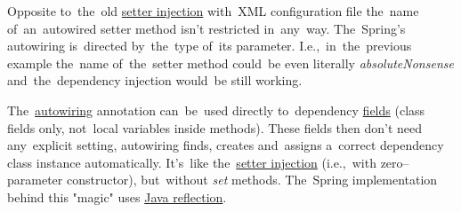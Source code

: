 \note Opposite to~the~old \hyperref[setterinjection]{setter injection} with~XML configuration file the~name of~an~autowired setter method isn't restricted in~any~way. The~Spring's autowiring is~directed by~the~type of~its parameter. I.e.,~in~the~previous example the~name of~the~setter method could~be even literally \textit{absoluteNonsense} and~the~dependency injection would~be still working.
\newpage

\label{fieldinjection}
The~\hyperref[autowiring]{autowiring} annotation can~be~used directly to~dependency \hyperref[variablefieldproperty]{fields} (class fields only, not~local variables inside methods). These fields then don't need any~explicit setting, autowiring finds, creates and~assigns a~correct dependency class instance automatically. It's~like the~\hyperref[setterinjection]{setter injection} (i.e.,~with zero--parameter constructor), but~without \textit{set} methods. The~Spring implementation behind this "magic" uses \hyperref[reflection]{Java reflection}.

